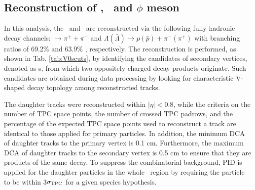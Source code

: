 \subsection{Reconstruction of \Ks, \lambdas~and $\phi$ meson}
\label{SubSec:K0sLambdaPhiRec}



In this analysis, the \Ks~and \lambdas~are reconstructed via the following fully hadronic decay channels: \Ks $\rightarrow \pi^{+} + \pi^{-}$ and  $\Lambda(\bar{\Lambda})\rightarrow p(\bar{p})+\pi^{-}(\pi^{+})$ with branching ratios of 69.2\% and 63.9\% \cite{Olive_2016}, respectively. The reconstruction is performed, as shown in Tab. \ref{tab:V0scuts}, by identifying the candidates of secondary vertices, denoted as \vo s, from which two oppositely-charged decay products originate. Such candidates are obtained during data processing by looking for characteristic V-shaped decay topology among reconstructed tracks.

The daughter tracks were reconstructed within $|\eta|<0.8$, while the criteria on the number of TPC space points, the number of crossed TPC padrows, and the percentage of the expected TPC space points used to reconstruct a track are identical to those applied for primary particles. In addition, the minimum DCA of daughter tracks to the primary vertex is 0.1 cm. Furthermore, the maximum DCA of daughter tracks to the secondary vertex is 0.5 cm to ensure that they are products of the same decay. To suppress the combinatorial background, PID is applied for the daughter particles in the whole \pT~region by requiring the particle to be within 3$\sigma_{\rm TPC}$ for a given species hypothesis.

